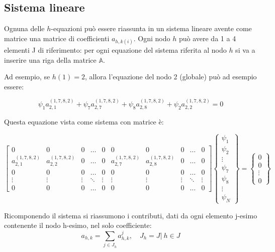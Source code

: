 \documentclass{tufte-handout}
\begin{document}
\subsection{Sistema lineare}
Ognuna delle $h$-equazioni può essere riassunta in un sistema lineare avente come matrice una matrice di coefficienti $a_{h,k(i)}$. Ogni nodo $h$ può avere da 1 a 4 elementi J di riferimento: per ogni equazione del sistema riferita al nodo $h$ si va a inserire una riga della matrice $\mathbb{A}$.

Ad esempio, se $h(1) = 2$, allora l'equazione del nodo 2 (globale) può ad esempio essere:
\begin{fullwidth}
    \begin{equation*}
        \psi_{1}
        a_{2,1}^{(1,7,8,2)}
        +
        \psi_{7}
        a_{2,7}^{(1,7,8,2)}
        +
        \psi_{8}
        a_{2,8}^{(1,7,8,2)}
        +
        \psi_{2}
        a_{2,2}^{(1,7,8,2)}
        =
        0
    \end{equation*}
\end{fullwidth}
Questa equazione vista come sistema con matrice è:
\begin{fullwidth}
    \[
        \begin{bmatrix}
            0					& 0 					& 0 					& \dots		& 0 		&	0					&	0					&	0	&	\dots & 0\\
a_{2,1}^{(1,7,8,2)} & a_{2,2}^{(1,7,8,2)} 	& 0  					& \dots		& 0 		& a_{2,7}^{(1,7,8,2)}	&	a_{2,8}^{(1,7,8,2)}	&	0	& 	\dots & 0\\
0					& 0 					& 0 					& \dots		& 0 		&	0					& 	0					&	0	& 	\dots & 0\\
\vdots				& \vdots 				& \vdots 				& \ddots	& \vdots 	&	\vdots				&	\vdots 				&	\vdots & \ddots& \vdots\\
0					& 0 					& 0 					& \dots  	& 0			&	0					&	0					&	0	& \dots & 0
        \end{bmatrix}
        \begin{Bmatrix}
            \psi_1       \\
            \psi_2       \\
            \vdots \\
            \psi_7 \\
            \psi_8 \\
            \vdots \\
            \psi_N       
            \end{Bmatrix}
        =
        \begin{Bmatrix}
            0       \\
            0       \\
            \vdots \\
            0       
        \end{Bmatrix}
    \]
\end{fullwidth}
Ricomponendo il sistema si riassumono i contributi, dati da ogni elemento j-esimo contenente il nodo h-esimo, nel solo coefficiente:
\begin{equation*}
    a_{h,k} = \sum_{j \in J_h} a_{h,k}^j, \quad J_h = J | \ h \in J
\end{equation*}
\end{document}
